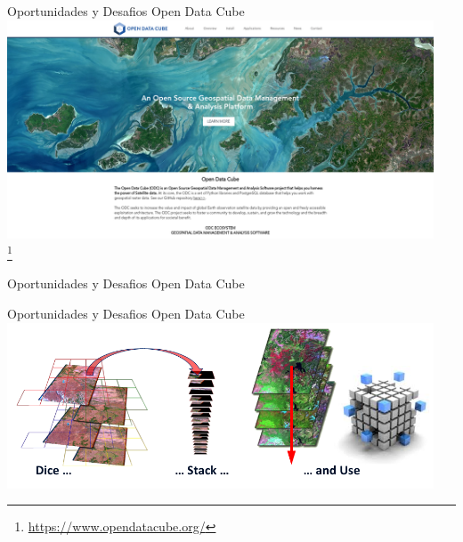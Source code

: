 \documentclass{beamer}
\newcommand\blfootnote[1]{%
  \begingroup
  \renewcommand\thefootnote{}\footnote{#1}%
  \addtocounter{footnote}{-1}%
  \endgroup
}
\begin{document}
\begin{frame}{Oportunidades y Desafios}
    Open Data Cube \\
    \centering
    \includegraphics[width=0.95\textwidth]{figures/odc}\\
    \blfootnote{\url{https://www.opendatacube.org/}}
\end{frame}
\begin{frame}{Oportunidades y Desafios}
    Open Data Cube \\
    \centering
\end{frame}
\begin{frame}{Oportunidades y Desafios}
    Open Data Cube \\
    \centering
    \includegraphics[width=0.95\textwidth]{figures/cube2}\\
\end{frame}
\end{document}
